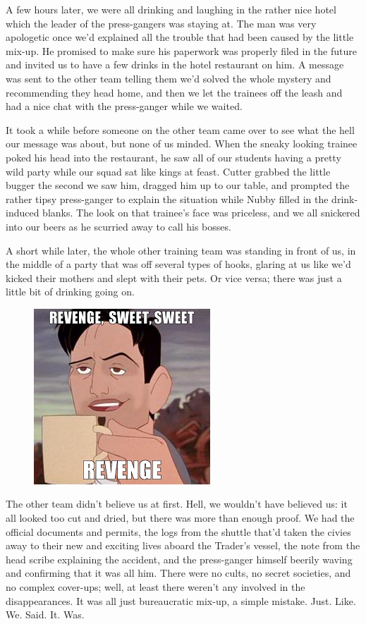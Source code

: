 A few hours later, we were all drinking and laughing in the rather nice hotel which the leader of the press-gangers was staying at. 
The man was very apologetic once we’d explained all the trouble that had been caused by the little mix-up. 
He promised to make sure his paperwork was properly filed in the future and invited us to have a few drinks in the hotel restaurant on him. 
A message was sent to the other team telling them we’d solved the whole mystery and recommending they head home, and then we let the trainees off the leash and had a nice chat with the press-ganger while we waited.

It took a while before someone on the other team came over to see what the hell our message was about, but none of us minded. 
When the sneaky looking trainee poked his head into the restaurant, he saw all of our students having a pretty wild party while our squad sat like kings at feast. 
Cutter grabbed the little bugger the second we saw him, dragged him up to our table, and prompted the rather tipsy press-ganger to explain the situation while Nubby filled in the drink-induced blanks. 
The look on that trainee’s face was priceless, and we all snickered into our beers as he scurried away to call his bosses.

A short while later, the whole other training team was standing in front of us, in the middle of a party that was off several types of hooks, glaring at us like we’d kicked their mothers and slept with their pets. 
Or vice versa; 
there was just a little bit of drinking going on.

\begin{figure}
	\begin{center}
		\includegraphics[width=\figwidth]{pics/8/33.png}
	\end{center}
\end{figure}
The other team didn’t believe us at first. 
Hell, we wouldn’t have believed us: 
it all looked too cut and dried, but there was more than enough proof. 
We had the official documents and permits, the logs from the shuttle that’d taken the civies away to their new and exciting lives aboard the Trader’s vessel, the note from the head scribe explaining the accident, and the press-ganger himself beerily waving and confirming that it was all him. 
There were no cults, no secret societies, and no complex cover-ups; 
well, at least there weren’t any involved in the disappearances. 
It was all just bureaucratic mix-up, a simple mistake. 
Just. 
Like. 
We. 
Said. 
It. 
Was.

